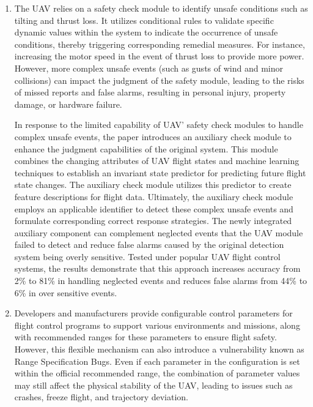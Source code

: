 \begin{enumerate}
    \item The UAV relies on a safety check module to identify unsafe conditions such as tilting and thrust loss. 
    It utilizes conditional rules to validate specific dynamic values within the system to indicate the occurrence of unsafe conditions, thereby triggering corresponding remedial measures.
    For instance, increasing the motor speed in the event of thrust loss to provide more power. However, more complex unsafe events (such as gusts of wind and minor collisions) can impact the judgment of the safety module, leading to the risks of missed reports and false alarms, resulting in personal injury, property damage, or hardware failure.
    
    
    In response to the limited capability of UAV' safety check modules to handle complex unsafe events, the paper introduces an auxiliary check module to enhance the judgment capabilities of the original system. 
    This module combines the changing attributes of UAV flight states and machine learning techniques to establish an invariant state predictor for predicting future flight state changes. The auxiliary check module utilizes this predictor to create feature descriptions for flight data. 
    Ultimately, the auxiliary check module employs an applicable identifier to detect these complex unsafe events and formulate corresponding correct response strategies. 
    The newly integrated auxiliary component can complement neglected events that the UAV module failed to detect and reduce false alarms caused by the original detection system being overly sensitive.
    Tested under popular UAV flight control systems, the results demonstrate that this approach increases accuracy from 2\% to 81\% in handling neglected events and reduces false alarms from 44\% to 6\% in over sensitive events.

    \item Developers and manufacturers provide configurable control parameters for flight control programs to support various environments and missions, along with recommended ranges for these parameters to ensure flight safety.
    However, this flexible mechanism can also introduce a vulnerability known as Range Specification Bugs. Even if each parameter in the configuration is set within the official recommended range, the combination of parameter values may still affect the physical stability of the UAV, leading to issues such as crashes, freeze flight, and trajectory deviation.
    

\end{enumerate}
